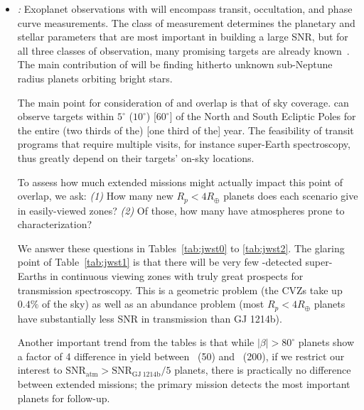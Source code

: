 \begin{itemize}
	\item \textit{\jwst:}
	Exoplanet observations with \jwst will encompass transit, occultation, and phase curve measurements.
	The class of measurement determines the planetary and stellar parameters that are most important in building a large SNR, but for all three classes of observation, many promising targets are already known~\citep{stevenson_communityJWST_2016}.
	The main contribution of \tess will be finding hitherto unknown sub-Neptune radius planets orbiting bright stars.

	The main point for consideration of \tess and \jwsts overlap is that of sky coverage.
	\jwst can observe targets within $5^\circ$ ($10^\circ$) [$60^\circ$] of the North and South Ecliptic Poles for the entire (two thirds of the) [one third of the] year.
	The feasibility of transit programs that require multiple visits, for instance super-Earth spectroscopy, thus greatly depend on their targets' on-sky locations.

	To assess how much extended \tess missions might actually impact this point of overlap, we ask:
	\textit{(1)} How many new $R_p<4R_\oplus$ planets does each scenario give in \jwsts easily-viewed zones? 
	\textit{(2)} Of those, how many have atmospheres prone to characterization?
	
	
	We answer these questions in Tables~\ref{tab:jwst0} to \ref{tab:jwst2}.
	The glaring point of Table~\ref{tab:jwst1} is that there will be very few \tess\!-detected super-Earths in \jwsts continuous viewing zones with truly great prospects for transmission spectroscopy.
	This is a geometric problem (the \jwst CVZs take up $0.4\%$ of the sky) as well as an abundance problem (most $R_p<4R_\oplus$ planets have substantially less SNR in transmission than GJ 1214b).
	
	Another important trend from the tables is that while $|\beta|>80^\circ$ planets show a factor of 4 difference in yield between \eshort\ (50) and \hemis\ (200), if we restrict our interest to $\mathrm{SNR}_\mathrm{atm} > \mathrm{SNR}_\mathrm{GJ\ 1214b}/5$ planets, there is practically no difference between extended missions; the primary mission detects the most important planets for \jwst follow-up.
	

\end{itemize}

